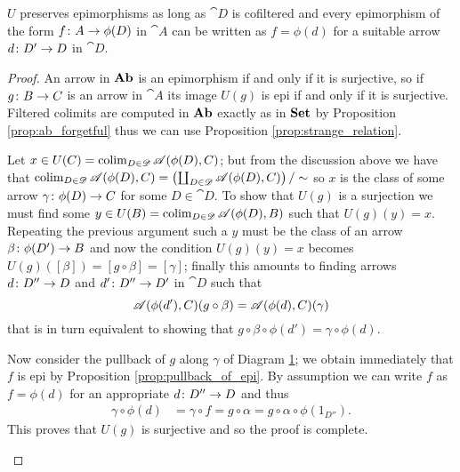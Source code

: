 \begin{lemma}
  \label{lemma:U_preserves_epis}
  \(U\) preserves epimorphisms as long as \(\cat{D}\) is cofiltered and every epimorphism of the form \(f\colon A\to \phi(D)\) in \(\cat{A}\) can be written as \(f = \phi(d)\) for a suitable arrow \(d\colon D'\to D\) in \(\cat{D}\).
\end{lemma}

\begin{proof}
  An arrow in \(\text{\normalfont\textbf{Ab}}\) is an epimorphism if and only if it is surjective, so if \(g\colon B\to C\) is an arrow in \(\cat{A}\) its image \(U(g)\) is epi if and only if it is surjective. Filtered colimits are computed in \(\text{\normalfont\textbf{Ab}}\) exactly as in \(\text{\normalfont\textbf{Set}}\) by Proposition \ref{prop:ab_forgetful} thus we can use Proposition \ref{prop:strange_relation}.

  Let \(x\in U(C) = \operatorname*{colim}_{D\in{\mathscr D}}{\mathscr A}(\phi(D),C)\); but from the discussion above we have that \(\operatorname*{colim}_{D\in{\mathscr D}}{\mathscr A}(\phi(D),C) = \left(\coprod_{D\in{\mathscr D}}{\mathscr A}(\phi(D),C)\right)/\sim\) so \(x\) is the class of some arrow \(\gamma\colon \phi(D)\to C\) for some \(D\in\cat{D}\). To show that \(U(g)\) is a surjection we must find some \(y\in U(B) = \operatorname*{colim}_{D\in{\mathscr D}}{\mathscr A}(\phi(D),B)\) such that \(U(g)(y) = x\). Repeating the previous argument such a \(y\) must be the class of an arrow \(\beta\colon \phi(D')\to B\) and now the condition \(U(g)(y) = x\) becomes \(U(g)([\beta]) = [g\circ\beta] = [\gamma]\); finally this amounts to finding arrows \(d\colon D''\to D\) and \(d'\colon D''\to D'\) in \(\cat{D}\) such that
  \begin{equation*}
    {\mathscr A}(\phi(d'),C)(g\circ\beta) = {\mathscr A}(\phi(d),C)(\gamma)
  \end{equation*}
  that is in turn equivalent to showing that \(g\circ\beta\circ\phi(d') = \gamma\circ\phi(d)\).

  Now consider the pullback of \(g\) along \(\gamma\) of Diagram \ref{diagram:pullback_eq}; we obtain immediately that \(f\) is epi by Proposition \ref{prop:pullback_of_epi}. By assumption we can write \(f\) as \(f = \phi({d})\) for an appropriate \(d\colon D''\to D\) and thus
  \begin{align*}
    \gamma\circ\phi(d) &= \gamma\circ f = g\circ\alpha = g\circ\alpha\circ\phi(1_{D''}).
  \end{align*}
   This proves that \(U(g)\) is surjective and so the proof is complete.

  \begin{figure}[h]
    
    \caption{}
    \label{diagram:pullback_eq}
  \end{figure}
\end{proof}

